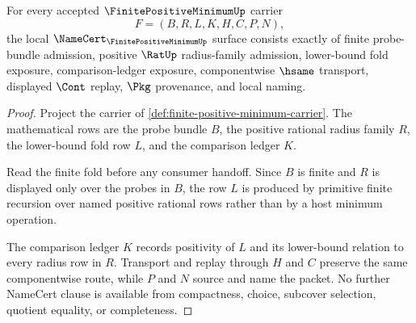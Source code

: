 \begin{theorem}
\label{thm:finite-positive-minimum-namecert-obligations}
For every accepted $\FinitePositiveMinimumUp$ carrier
$$
F=(B,R,L,K,H,C,P,N),
$$
the local $\NameCert_{\FinitePositiveMinimumUp}$ surface consists exactly of finite probe-bundle admission, positive $\RatUp$ radius-family admission, lower-bound fold exposure, comparison-ledger exposure, componentwise $\hsame$ transport, displayed $\Cont$ replay, $\Pkg$ provenance, and local naming.
\end{theorem}
\begin{proof}
Project the carrier of \autoref{def:finite-positive-minimum-carrier}. The mathematical rows are the probe bundle $B$, the positive rational radius family $R$, the lower-bound fold row $L$, and the comparison ledger $K$.

Read the finite fold before any consumer handoff. Since $B$ is finite and $R$ is displayed only over the probes in $B$, the row $L$ is produced by primitive finite recursion over named positive rational rows rather than by a host minimum operation.

The comparison ledger $K$ records positivity of $L$ and its lower-bound relation to every radius row in $R$. Transport and replay through $H$ and $C$ preserve the same componentwise route, while $P$ and $N$ source and name the packet. No further NameCert clause is available from compactness, choice, subcover selection, quotient equality, or completeness.
\end{proof}

